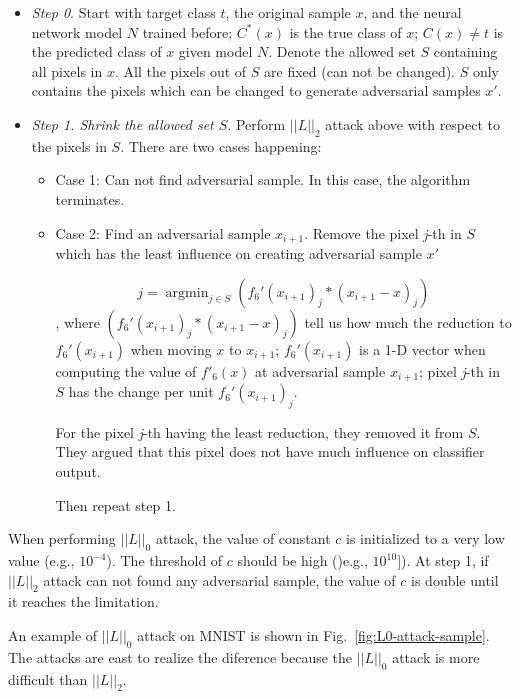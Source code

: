 \documentclass[12pt]{article}
\DeclareMathOperator*{\argmin}{argmin}
\begin{document}
\begin{itemize}
	\item \textit{Step 0}. Start with target class $t$, the original sample $x$, and the neural network model $N$ trained before; $C^*(x) $ is the true class of $x$; $C(x) \ne t$ is the predicted class of $x$ given model $N$. Denote the allowed set $S$ containing all pixels in $x$. All the pixels out of $S$ are fixed (can not be changed). $S$ only contains the pixels which can be changed to generate adversarial samples $x'$.
	
	\item \textit{Step 1. Shrink the allowed set $S$}. 	Perform $||L||_2$ attack above with respect to the pixels in $S$. There are two cases happening:
	\begin{itemize}
		\item Case 1: Can not find adversarial sample. In this case, the algorithm terminates.
		\item Case 2: Find an adversarial sample $x_{i+1}$. Remove the pixel \textit{j}-th in $S$ which has the least influence on creating adversarial sample $x'$
		
		\begin{equation}
		j = \argmin_{j \in S} (f_6'(x_{i+1})_j * (x_{i+1} - x)_j)
		\end{equation}
		, where $(f_6'(x_{i+1})_j * (x_{i+1} - x)_j)$ tell us how much the reduction to $f_6'(x_{i+1})$ when moving $x$ to $x_{i+1}$; $f_6'(x_{i+1})$ is a 1-D vector when computing the value of $f'_6(x)$ at adversarial sample $x_{i+1}$; pixel \textit{j}-th in $S$ has the change per unit $f_6'(x_{i+1})_j$. 
		
		For the pixel \textit{j}-th having the least reduction, they removed it from $S$. They argued that this pixel does not have much influence on classifier output.
		
		Then repeat step 1.
	\end{itemize}
	
\end{itemize}

When performing $||L||_0$ attack, the value of constant $c$ is initialized to a very low value (e.g., $10^{-4}$). The threshold of $c$ should be high ()e.g., $10^{10}]$). At step 1, if $||L||_2$ attack can not found any adversarial sample, the value of $c$ is double until it reaches the limitation.

An example of $||L||_0$ attack on MNIST is shown in Fig.~\ref{fig:L0-attack-sample}.
The attacks are east to realize the diference because the $||L||_0$ attack is more difficult than $||L||_2$.
\end{document}
